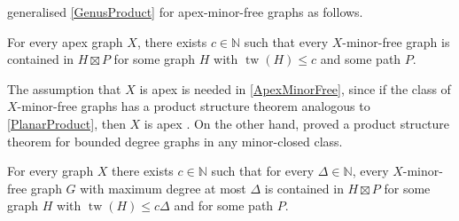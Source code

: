 \documentclass{patmorin}
\newcommand{\note}[2]{\noindent{\color{red}[#1:~#2]}}
\DeclareMathOperator{\tw}{tw}
\renewcommand{\SS}{\mathcal{S}}
\renewcommand{\geq}{\geqslant}
\renewcommand{\leq}{\leqslant}
\begin{document}
\citet{DJMMUW20} generalised \cref{GenusProduct} for apex-minor-free graphs as follows.

\begin{thm}
	\label{ApexMinorFree}
	For every apex graph $X$, there exists $c\in\mathbb{N}$ such that every $X$-minor-free graph is contained in $H\boxtimes P$ for some graph $H$ with $\tw(H)\leq c$ and some path $P$.
\end{thm}

The assumption that $X$ is apex is needed in \cref{ApexMinorFree}, since if the class of $X$-minor-free graphs has a product structure theorem analogous to \cref{PlanarProduct}, then $X$ is apex \citep{DJMMUW20}. On the other hand, \citet{DEMWW22} proved a product structure theorem for bounded degree graphs in any minor-closed class.

\begin{thm}
	\label{MinorFreeDegree}
	For every graph $X$ there exists $c\in\mathbb{N}$ such that for every $\Delta\in\mathbb{N}$, every $X$-minor-free graph $G$ with maximum degree at most $\Delta$ is contained in $H\boxtimes P$ for some graph $H$ with $\tw(H) \leq c\Delta$ and for some path $P$.
\end{thm}

%
%
%
%
\end{document}
